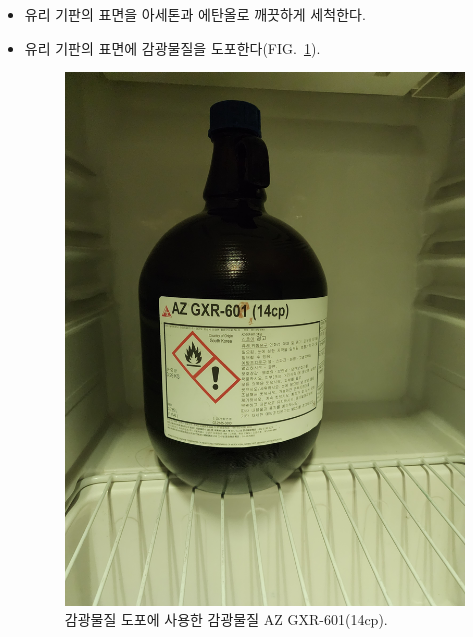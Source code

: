 \documentclass[aps,reprint,superscriptaddress,10pt]{revtex4-2}
\begin{document}
\begin{itemize}
  \item[1. ]
  유리 기판의 표면을 아세톤과 에탄올로 깨끗하게 세척한다.
  \item[2. ]
  유리 기판의 표면에 감광물질을 도포한다(FIG.~\ref{fig:photoresist}). 
  
  \begin{figure}[htbp]
    \centering
    \includegraphics[scale=0.04,angle=270]{photoresist.JPG}
    \caption{감광물질 도포에 사용한 감광물질 AZ GXR-601(14cp).}
    \label{fig:photoresist}
  \end{figure}
  

\end{itemize}
\end{document}
